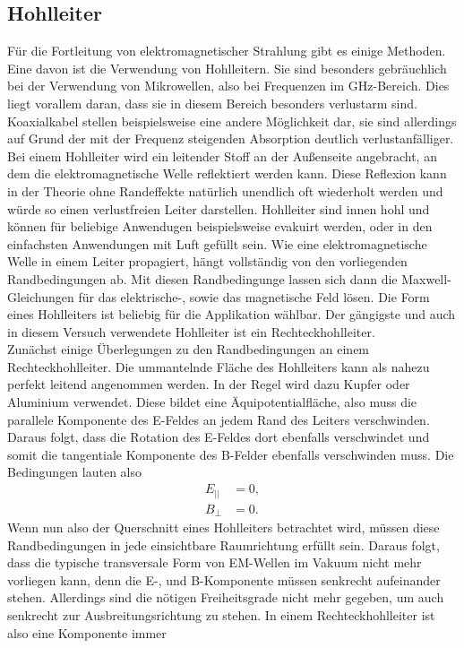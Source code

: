 \subsection{Hohlleiter}
Für die Fortleitung von elektromagnetischer Strahlung gibt es einige Methoden. Eine davon ist die Verwendung von Hohlleitern. Sie sind besonders gebräuchlich bei der Verwendung von Mikrowellen, also bei Frequenzen im $\si{\giga\hertz}$-Bereich.
Dies liegt vorallem daran, dass sie in diesem Bereich besonders verlustarm sind. Koaxialkabel stellen beispielsweise eine andere Möglichkeit dar, sie sind allerdings auf Grund der mit der Frequenz steigenden Absorption deutlich 
verlustanfälliger. Bei einem Hohlleiter wird ein leitender Stoff an der Außenseite angebracht, an dem die elektromagnetische Welle reflektiert werden kann. Diese Reflexion kann in der Theorie ohne Randeffekte natürlich unendlich oft
wiederholt werden und würde so einen verlustfreien Leiter darstellen. Hohlleiter sind innen hohl und können für beliebige Anwendugen beispielsweise evakuirt werden, oder
in den einfachsten Anwendungen mit Luft gefüllt sein.
Wie eine elektromagnetische Welle in einem Leiter propagiert, hängt vollständig von den vorliegenden Randbedingungen ab. Mit diesen Randbedingunge lassen sich dann die Maxwell-Gleichungen für das elektrische-, sowie das magnetische Feld lösen.
Die Form eines Hohlleiters ist beliebig für die Applikation wählbar. Der gängigste und auch in diesem Versuch verwendete Hohlleiter ist ein Rechteckhohlleiter. 
\\
\newline
Zunächst einige Überlegungen zu den Randbedingungen an einem Rechteckhohlleiter. Die ummantelnde Fläche des Hohlleiters kann als nahezu perfekt leitend angenommen werden. In der Regel wird dazu Kupfer oder Aluminium verwendet. Diese bildet eine 
Äquipotentialfläche, also muss die parallele Komponente des E-Feldes an jedem Rand des Leiters verschwinden. Daraus folgt, dass die Rotation des E-Feldes dort ebenfalls verschwindet und somit die tangentiale Komponente des B-Felder ebenfalls
verschwinden muss. Die Bedingungen lauten also
\begin{align*}
E_{||} &= 0, \\
B_{⊥} &= 0.
\end{align*}
Wenn nun also der Querschnitt eines Hohlleiters betrachtet wird, müssen diese Randbedingungen in jede einsichtbare Raumrichtung erfüllt sein. Daraus folgt, dass die typische transversale Form von EM-Wellen im Vakuum nicht mehr vorliegen kann, denn
die E-, und B-Komponente müssen senkrecht aufeinander stehen. Allerdings sind die nötigen Freiheitsgrade nicht mehr gegeben, um auch senkrecht zur Ausbreitungsrichtung zu stehen. In einem Rechteckhohlleiter ist also eine Komponente immer
